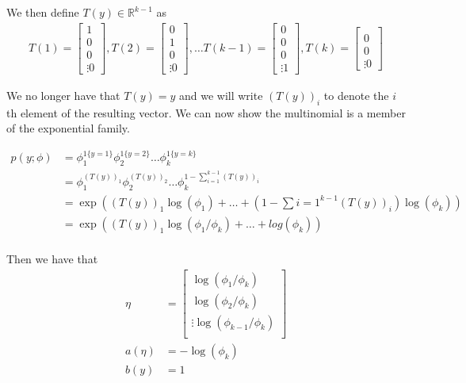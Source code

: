 \documentclass[11pt]{exam}
\newcommand{\idctr}[1]{1\{#1\}}
\begin{document}
We then define $T(y) \in \mathbb{R}^{k-1}$ as
\begin{align*}
T(1) = \begin{bmatrix}
1\\
0\\
0\\
\vdots
0
\end{bmatrix}
,
T(2) = \begin{bmatrix}
0\\
1\\
0\\
\vdots
0
\end{bmatrix}
,
\dots
T(k-1) = \begin{bmatrix}
0\\
0\\
0\\
\vdots
1
\end{bmatrix}
,
T(k) = \begin{bmatrix}
\\
0\\
0\\
\vdots
0
\end{bmatrix}
\end{align*}

We no longer have that $T(y) = y$ and we will write $(T(y))_i$ to denote the $i$th element of the resulting vector. We can now show the multinomial is a member of the exponential family.

\begin{align*}
p(y;\phi) &= \phi_1^{\idctr{y=1}}\phi_2^{\idctr{y=2}}\dots\phi_k^{\idctr{y=k}}\\
          &= \phi_1^{(T(y))_1}\phi_2^{(T(y))_2}\dots\phi_k^{1- \sum_{i=1}^{k-1}(T(y))_i}\\
          &= \exp((T(y))_1\log(\phi_1) + \dots + (1 - \sum{i=1}^{k-1}(T(y))_i)\log(\phi_k))\\
          &= \exp((T(y))_1\log(\phi_1/\phi_k) + \dots + log(\phi_k))\\
\end{align*}

Then we have that
\begin{align*}
\eta &= \begin{bmatrix}
\log(\phi_1/\phi_k)\\
\log(\phi_2/\phi_k)\\
\vdots
\log(\phi_{k-1}/\phi_k)\\
\end{bmatrix}\\

a(\eta) &= -\log(\phi_k)\\
b(y) &= 1
\end{align*}
\end{document}

